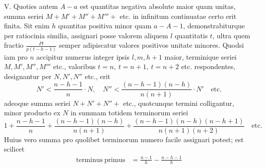 V. Quoties autem $A-a$ est quantitas negativa absolute maior quam unitas, summa seriei $M+M'+M''+M'''+$ etc. in infinitum continuatae certo erit finita. Sit enim $h$ quantitas positiva minor quam $a-A-1$, demonstrabiturque per ratiocinia similia, assignari posse valorem aliquem $l$ quantitatis $t$, ultra quem fractio $\frac{Pt}{p(t-h-1)}$ semper adipiscatur valores positivos unitate minores. Quodsi iam pro $n$ accipitur numerus integer ipsis $l,m,h+1$ maior, terminique seriei $M,M',M'',M'''$ etc., valoribus $t=n,\ t=n+1,\ t=n+2$ etc. respondentes, designantur per $N,N',N''$ etc., erit
\[
N'<\frac{n-h-1}{n}\cdot N,\quad
N''<\frac{(n-h-1)(n-h)}{n(n+1)}\cdot N'\quad\mathrm{etc.}
\]
adeoque summa seriei $N+N'+N''+$ etc., quotcunque termini colligantur, minor producto ex $N$ in summam totidem terminorum seriei
\[
1+\frac{n-h-1}{n}+\frac{(n-h-1)(n-h)}{n(n+1)}+
\frac{(n-h-1)(n-h)(n-h+1)}{n(n+1)(n+2)}\quad\mathrm{etc.}
\]
Huius vero summa pro quolibet terminorum numero facile assignari potest; est scilicet
\[
\begin{array}{lr}
\mathrm{terminus\ primus}&=\displaystyle\frac{n-1}{h}-\frac{n-h-1}{h}
\end{array}
\]
